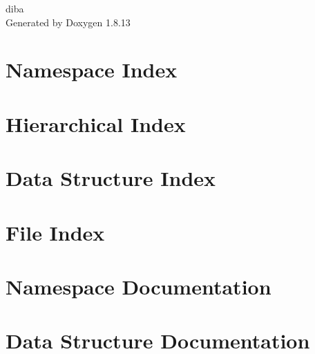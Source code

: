 \documentclass[twoside]{book}
\newcommand{\+}{\discretionary{\mbox{\scriptsize$\hookleftarrow$}}{}{}}
\newcommand{\clearemptydoublepage}{%
  \newpage{\pagestyle{empty}\cleardoublepage}%
}
\begin{document}
\hypersetup{pageanchor=false,
             bookmarksnumbered=true,
             pdfencoding=unicode
            }
\begin{titlepage}
\vspace*{7cm}
\begin{center}%
{\Large diba }\\
\vspace*{1cm}
{\large Generated by Doxygen 1.8.13}\\
\end{center}
\end{titlepage}
\clearemptydoublepage
{}
\tableofcontents
\clearemptydoublepage
{}
\hypersetup{pageanchor=true}

\chapter{Namespace Index}

\chapter{Hierarchical Index}

\chapter{Data Structure Index}

\chapter{File Index}

\chapter{Namespace Documentation}










\chapter{Data Structure Documentation}














\end{document}
